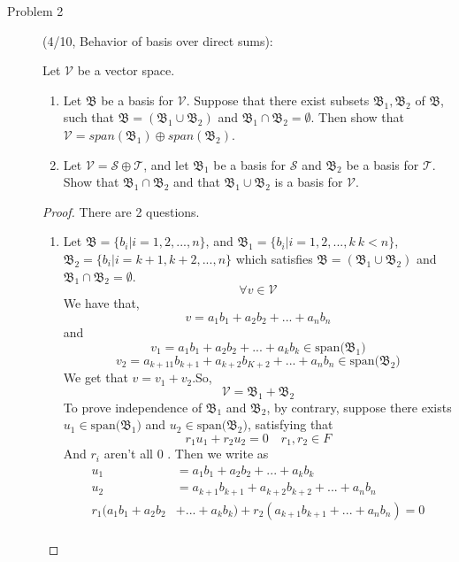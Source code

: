 \documentclass[a4paper]{article}
\begin{document}
\begin{description}
  \item[Problem 2](4/10, Behavior of basis over direct sums):{

  Let $\mathcal{V}$ be a vector space.
  \begin{enumerate}
    \item Let $\mathfrak{B}$ be a basis for $\mathcal{\mathcal{V}}$. Suppose that  there
    exist subsets $\mathfrak{B}_{1},\mathfrak{B}_2$ of $\mathfrak{B}$,
    such that $\mathfrak{B}=(\mathfrak{B}_{1}\cup\mathfrak{B}_{2})$ and
     $\mathfrak{B}_{1}\cap\mathfrak{B}_{2}=\emptyset$. Then show
     that $\mathcal{\mathcal{V}}=span(\mathfrak{B}_{1})\oplus span(\mathfrak{B}_{2})$.
      \item Let $\mathcal{\mathcal{V}}=\mathcal{S}\oplus\mathcal{T}$, and let $\mathfrak{B}_{1}$ be a basis for $\mathcal{S}$ and $\mathfrak{B}_{2}$ be a basis for $\mathcal{T}$.
    Show that $\mathfrak{B}_{1}\cap\mathfrak{B}_{2}$ and that $\mathfrak{B}_{1}\cup\mathfrak{B}_{2}$ is a basis for $\mathcal{V}$.
  \end{enumerate}
  }
  \begin{proof}
    There are 2 questions.
    \begin{enumerate}
      \item Let $\mathfrak{B}=\{b_{i} | i=1,2,...,n\}$, and
      $\mathfrak{B}_{1}=\{b_{i} | i=1,2,...,k\  k<n\}$,$\mathfrak{B}_{2}=\{b_{i}| i=k+1,k+2,...,n\}$
      which satisfies
      $\mathfrak{B}=(\mathfrak{B}_{1}\cup\mathfrak{B}_{2})$ and
       $\mathfrak{B}_{1}\cap\mathfrak{B}_{2}=\emptyset$.
       $$\forall  v  \in   \mathcal{V}$$
       We have that,
         $$v=a_{1}b_{1}+a_{2}b_{2}+...+a_{n}b_{n}$$
        and
         $$v_{1}=a_{1}b_{1}+a_{2}b_{2}+...+a_{k}b_{k} \in \text{span($\mathfrak{B}_{1}$)}$$
         $$v_{2}=a_{k+11}b_{k+1}+a_{k+2}b_{K+2}+...+a_{n}b_{n} \in \text{span($\mathfrak{B}_{2}$)}$$
       We get that $v=v_{1}+v_{2}$.So, $$\mathcal{V}=\mathfrak{B}_{1}+\mathfrak{B}_{2}$$
       To prove independence of $\mathfrak{B}_{1}$ and $\mathfrak{B}_{2}$,
       by contrary, suppose there exists $u_{1}\in \text{span($\mathfrak{B}_{1}$)}$ and
       $u_{2}\in \text{span($\mathfrak{B}_{2}$)}$, satisfying that
        $$r_{1}u_{1}+r_{2}u_{2}=0\quad r_{1},r_{2}\in F$$
        And $r_{i}$ aren't all $0$ . Then we write as
        \begin{align*}
          u_{1}&=a_{1}b_{1}+a_{2}b_{2}+...+a_{k}b_{k}\\
          u_{2}&=a_{k+1}b_{k+1}+a_{k+2}b_{k+2}+...+a_{n}b_{n}\\
          r_{1}(a_{1}b_{1} +a_{2}b_{2} &  +... +a_{k}b_{k})+ r_{2}(a_{k+1}b_{k+1}+...+a_{n}b_{n})=0\\

\end{align*}
\end{enumerate}
\end{proof}
\end{description}
\end{document}
